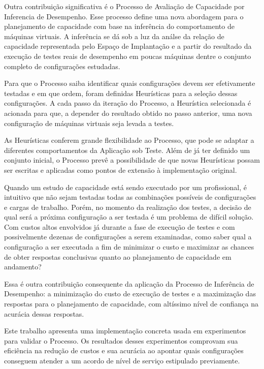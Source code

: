 Outra contribuição significativa é o Processo de Avaliação de Capacidade por 
Inferencia de Desempenho. Esse processo define uma nova abordagem para o 
planejamento de capacidade com base na inferência do comportamento de máquinas 
virtuais. A inferência se dá sob a luz da análse da relação de capacidade 
representada pelo Espaço de Implantação e a partir do resultado da execução de 
testes reais de desempenho em poucas máquinas dentre o conjunto completo de 
configurações estudadas.

Para que o Processo saiba identificar quais configurações devem ser efetivamente
testadas e em que ordem, foram definidas Heurísticas para a seleção dessas 
configurações. A cada passo da iteração do Processo, a Heurística selecionada é
acionada para que, a depender do resultado obtido no passo anterior, uma nova
configuração de máquinas virtuais seja levada a testes.

As Heurísticas conferem grande flexibilidade ao Processo, que pode se adaptar a
diferentes comportamentos da Aplicação sob Teste. Além de já ter definido um 
conjunto inicial, o Processo prevê a possibilidade de que novas Heurísticas possam
ser escritas e aplicadas como pontos de extensão à implementação original.

Quando um estudo de capacidade está sendo executado por um profissional, é 
intuitivo que não sejam testadas todas as combinações possíveis de configurações
e cargas de trabalho. Porém, no momento da realização dos testes, a decisão de
qual será a próxima configuração a ser testada é um problema de difícil solução.
Com custos altos envolvidos já durante a fase de execução de testes e com 
possivelmente dezenas de configurações a serem examinadas, como saber qual a
configuração a ser executada a fim de minimizar o custo e maximizar as chances
de obter respostas conclusivas quanto ao planejamento de capacidade em andamento?

Essa é outra contribuição consequente da aplicação da Processo de Inferência de
Desempenho: a minimização do custo de execução de testes e a maximização das 
respostas para o planejamento de capacidade, com altíssimo nível de confiança na
acurácia dessas respostas.

Este trabalho apresenta uma implementação concreta usada em experimentos para 
validar o Processo. Os resultados desses experimentos comprovam sua eficiência 
na redução de custos e sua acurácia ao apontar quais configurações conseguem 
atender a um acordo de nível de serviço estipulado previamente. 

